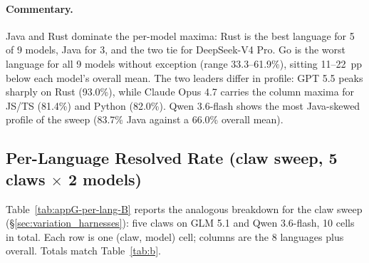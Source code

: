 \documentclass{llmxive}
\begin{document}
\paragraph{Commentary.}
Java and Rust dominate the per-model maxima: Rust is the best language for 5 of
9 models, Java for 3, and the two tie for DeepSeek-V4 Pro. Go is the worst
language for all 9 models without exception (range 33.3--61.9\%), sitting
11--22~pp below each model's overall mean. The two leaders differ in profile:
GPT 5.5 peaks sharply on Rust (93.0\%), while Claude Opus 4.7 carries the
column maxima for JS/TS (81.4\%) and Python (82.0\%). Qwen 3.6-flash shows the
most Java-skewed profile of the sweep (83.7\% Java against a 66.0\% overall
mean).

\subsection{Per-Language Resolved Rate (claw sweep, 5 claws \texorpdfstring{$\times$}{...} 2 models)}
\label{appendix:per-repo:g2}

Table~\ref{tab:appG-per-lang-B} reports the analogous breakdown for the claw
sweep (\S\ref{sec:variation_harnesses}): five claws on GLM 5.1 and
Qwen 3.6-flash, 10 cells in total. Each row is one (claw, model) cell; columns
are the 8 languages plus overall. Totals match Table~\ref{tab:b}.
\end{document}
